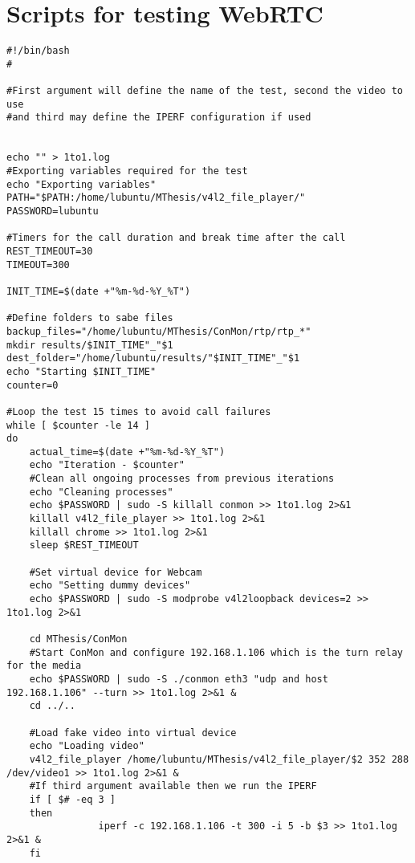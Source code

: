 \section{Scripts for testing WebRTC}
\label{sec:scriptsWebRTC}

\thispagestyle{empty}



\lstset{language=bash}
\begin{lstlisting}[caption=Script for P2P testing with 15 iterations]
#!/bin/bash
#

#First argument will define the name of the test, second the video to use
#and third may define the IPERF configuration if used


echo "" > 1to1.log
#Exporting variables required for the test
echo "Exporting variables"
PATH="$PATH:/home/lubuntu/MThesis/v4l2_file_player/"
PASSWORD=lubuntu

#Timers for the call duration and break time after the call
REST_TIMEOUT=30
TIMEOUT=300

INIT_TIME=$(date +"%m-%d-%Y_%T")

#Define folders to sabe files
backup_files="/home/lubuntu/MThesis/ConMon/rtp/rtp_*"
mkdir results/$INIT_TIME"_"$1
dest_folder="/home/lubuntu/results/"$INIT_TIME"_"$1
echo "Starting $INIT_TIME"
counter=0

#Loop the test 15 times to avoid call failures
while [ $counter -le 14 ]
do
	actual_time=$(date +"%m-%d-%Y_%T")
	echo "Iteration - $counter"
 	#Clean all ongoing processes from previous iterations
 	echo "Cleaning processes"
 	echo $PASSWORD | sudo -S killall conmon >> 1to1.log 2>&1
 	killall v4l2_file_player >> 1to1.log 2>&1
 	killall chrome >> 1to1.log 2>&1
	sleep $REST_TIMEOUT
 
 	#Set virtual device for Webcam
 	echo "Setting dummy devices"
 	echo $PASSWORD | sudo -S modprobe v4l2loopback devices=2 >> 1to1.log 2>&1

 	cd MThesis/ConMon
 	#Start ConMon and configure 192.168.1.106 which is the turn relay for the media
 	echo $PASSWORD | sudo -S ./conmon eth3 "udp and host 192.168.1.106" --turn >> 1to1.log 2>&1 &
 	cd ../..

 	#Load fake video into virtual device
 	echo "Loading video"
 	v4l2_file_player /home/lubuntu/MThesis/v4l2_file_player/$2 352 288 /dev/video1 >> 1to1.log 2>&1 &
 	#If third argument available then we run the IPERF
 	if [ $# -eq 3 ]
 	then 
        		iperf -c 192.168.1.106 -t 300 -i 5 -b $3 >> 1to1.log 2>&1 &
 	fi
 

\end{lstlisting}
